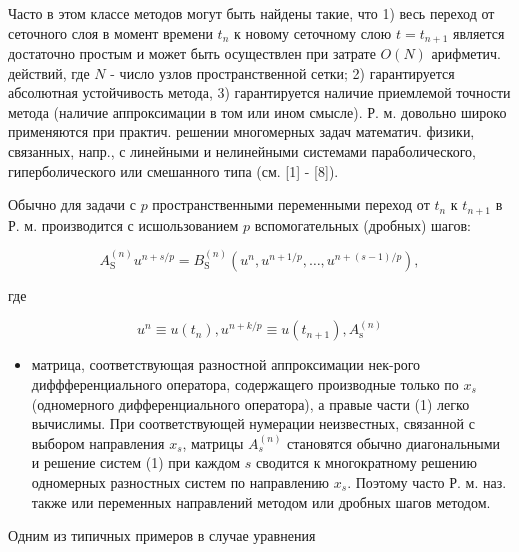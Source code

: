 \documentclass[10pt]{article}
\begin{document}
Часто в этом классе методов могут быть найдены такие, что 1) весь переход от сеточного слоя в момент времени $t_{n}$ к новому сеточному слою $t=t_{n+1}$ является достаточно простым и может быть осуществлен при затрате $O(N)$ арифметич. действий, где $N$ - число узлов пространственной сетки; 2) гарантируется абсолютная устойчивость метода, 3) гарантируется наличие приемлемой точности метода (наличие аппроксимации в том или ином смысле). Р. м. довольно широко применяются при практич. решении многомерных задач математич. физики, связанных, напр., с линейными и нелинейными системами параболического, гиперболического или смешанного типа (см. [1] - [8]).



Обычно для задачи с $p$ пространственными переменными переход от $t_{n}$ к $t_{n+1}$ в Р. м. производится с исшользованием $p$ вспомогательных (дробных) шагов:



\[

A_{\mathrm{S}}^{(n)} u^{n+s / p}=B_{\mathrm{S}}^{(n)}\left(u^{n}, u^{n+1 / p}, \ldots, u^{n+(s-1) / p}\right),

\]



где



\[

u^{n} \equiv u\left(t_{n}\right), u^{n+k / p} \equiv u\left(t_{n+1}\right), A_{\mathrm{s}}^{(n)}

\]



\begin{itemize}

  \item матрица, соответствующая разностной аппроксимации нек-рого диффференциального оператора, содержащего производные только по $x_{s}$ (одномерного дифференциального оператора), а правые части (1) легко вычислимы. При соответствующей нумерации неизвестных, связанной с выбором направления $x_{s}$, матрицы $A_{s}^{(n)}$ становятся обычно диагональными и решение систем (1) при каждом $s$ сводится к многократному решению одномерных разностных систем по направлению $x_{s}$. Поэтому часто Р. м. наз. также или переменных направлений методом или дробных шагов методом.

\end{itemize}



Одним из типичных примеров в случае уравнения
\end{document}
